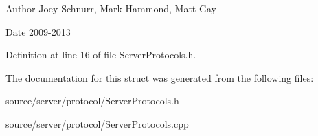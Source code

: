 \begin{DoxyAuthor}{Author}
Joey Schnurr, Mark Hammond, Matt Gay 
\end{DoxyAuthor}
\begin{DoxyDate}{Date}
2009-\/2013 
\end{DoxyDate}


Definition at line 16 of file Server\-Protocols.\-h.



The documentation for this struct was generated from the following files\-:\begin{DoxyCompactItemize}
\item 
source/server/protocol/Server\-Protocols.\-h\item 
source/server/protocol/Server\-Protocols.\-cpp\end{DoxyCompactItemize}
